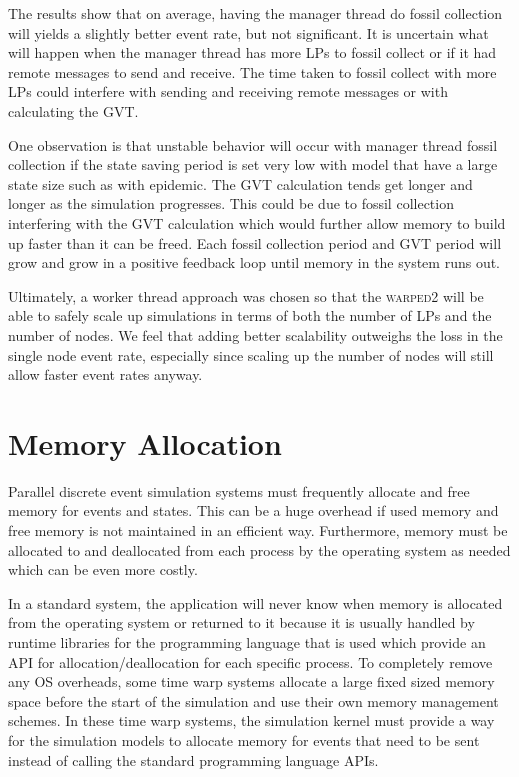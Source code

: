 \documentclass[11pt]{book}
\begin{document}
The results show that on average, having the manager thread do fossil collection will yields a
slightly better event rate, but not significant. It is uncertain what will happen when the
manager thread has more LPs to fossil collect or if it had remote messages to send and receive.
The time taken to fossil collect with more LPs could interfere with sending and receiving remote
messages or with calculating the GVT.

One observation is that unstable behavior will occur with manager thread fossil collection
if the state saving period is set very low with model that have a large state size such as with
epidemic. The GVT calculation tends get longer and longer as the simulation progresses. This could
be due to fossil collection interfering with the GVT calculation which would further allow memory
to build up faster than it can be freed. Each fossil collection period and GVT period will grow
and grow in a positive feedback loop until memory in the system runs out.

Ultimately, a worker thread approach was chosen so that the \textsc{warped2} will be able to
safely scale up simulations in terms of both the number of LPs and the number of nodes. We feel
that adding better scalability outweighs the loss in the single node event rate, especially since
scaling up the number of nodes will still allow faster event rates anyway.

\section{Memory Allocation}

Parallel discrete event simulation systems must frequently allocate and free memory for
events and states. This can be a huge overhead if used memory and free memory is not
maintained in an efficient way. Furthermore, memory must be allocated to and deallocated from
each process by the operating system as needed which can be even more costly.

In a standard system, the application will never know when memory is allocated from the operating
system or returned to it because it is usually handled by runtime libraries for the programming
language that is used which provide an API for allocation/deallocation for each specific
process. To completely remove any OS overheads, some time warp systems allocate a large fixed
sized memory space before the start of the simulation and use their own memory management
schemes. In these time warp systems, the simulation kernel must provide a way for the simulation
models to allocate memory for events that need to be sent instead of calling the standard programming
language APIs.
\end{document}
